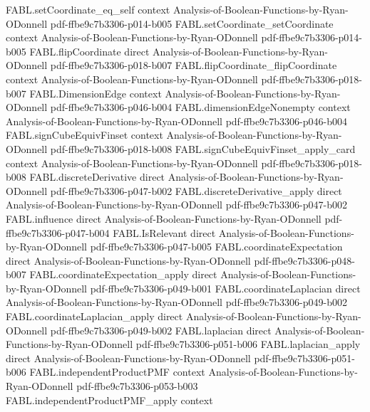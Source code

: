 \begin{theorem}
\proofstep
  {FABL.setCoordinate_eq_self}
  {context}
  {Analysis-of-Boolean-Functions-by-Ryan-ODonnell}
  {pdf-ffbe9c7b3306-p014-b005}
\proofstep
  {FABL.setCoordinate_setCoordinate}
  {context}
  {Analysis-of-Boolean-Functions-by-Ryan-ODonnell}
  {pdf-ffbe9c7b3306-p014-b005}
\proofstep
  {FABL.flipCoordinate}
  {direct}
  {Analysis-of-Boolean-Functions-by-Ryan-ODonnell}
  {pdf-ffbe9c7b3306-p018-b007}
\proofstep
  {FABL.flipCoordinate_flipCoordinate}
  {context}
  {Analysis-of-Boolean-Functions-by-Ryan-ODonnell}
  {pdf-ffbe9c7b3306-p018-b007}
\proofstep
  {FABL.DimensionEdge}
  {context}
  {Analysis-of-Boolean-Functions-by-Ryan-ODonnell}
  {pdf-ffbe9c7b3306-p046-b004}
\proofstep
  {FABL.dimensionEdgeNonempty}
  {context}
  {Analysis-of-Boolean-Functions-by-Ryan-ODonnell}
  {pdf-ffbe9c7b3306-p046-b004}
\proofstep
  {FABL.signCubeEquivFinset}
  {context}
  {Analysis-of-Boolean-Functions-by-Ryan-ODonnell}
  {pdf-ffbe9c7b3306-p018-b008}
\proofstep
  {FABL.signCubeEquivFinset_apply_card}
  {context}
  {Analysis-of-Boolean-Functions-by-Ryan-ODonnell}
  {pdf-ffbe9c7b3306-p018-b008}
\proofstep
  {FABL.discreteDerivative}
  {direct}
  {Analysis-of-Boolean-Functions-by-Ryan-ODonnell}
  {pdf-ffbe9c7b3306-p047-b002}
\proofstep
  {FABL.discreteDerivative_apply}
  {direct}
  {Analysis-of-Boolean-Functions-by-Ryan-ODonnell}
  {pdf-ffbe9c7b3306-p047-b002}
\proofstep
  {FABL.influence}
  {direct}
  {Analysis-of-Boolean-Functions-by-Ryan-ODonnell}
  {pdf-ffbe9c7b3306-p047-b004}
\proofstep
  {FABL.IsRelevant}
  {direct}
  {Analysis-of-Boolean-Functions-by-Ryan-ODonnell}
  {pdf-ffbe9c7b3306-p047-b005}
\proofstep
  {FABL.coordinateExpectation}
  {direct}
  {Analysis-of-Boolean-Functions-by-Ryan-ODonnell}
  {pdf-ffbe9c7b3306-p048-b007}
\proofstep
  {FABL.coordinateExpectation_apply}
  {direct}
  {Analysis-of-Boolean-Functions-by-Ryan-ODonnell}
  {pdf-ffbe9c7b3306-p049-b001}
\proofstep
  {FABL.coordinateLaplacian}
  {direct}
  {Analysis-of-Boolean-Functions-by-Ryan-ODonnell}
  {pdf-ffbe9c7b3306-p049-b002}
\proofstep
  {FABL.coordinateLaplacian_apply}
  {direct}
  {Analysis-of-Boolean-Functions-by-Ryan-ODonnell}
  {pdf-ffbe9c7b3306-p049-b002}
\proofstep
  {FABL.laplacian}
  {direct}
  {Analysis-of-Boolean-Functions-by-Ryan-ODonnell}
  {pdf-ffbe9c7b3306-p051-b006}
\proofstep
  {FABL.laplacian_apply}
  {direct}
  {Analysis-of-Boolean-Functions-by-Ryan-ODonnell}
  {pdf-ffbe9c7b3306-p051-b006}
\proofstep
  {FABL.independentProductPMF}
  {context}
  {Analysis-of-Boolean-Functions-by-Ryan-ODonnell}
  {pdf-ffbe9c7b3306-p053-b003}
\proofstep
  {FABL.independentProductPMF_apply}
  {context}

\end{theorem}
